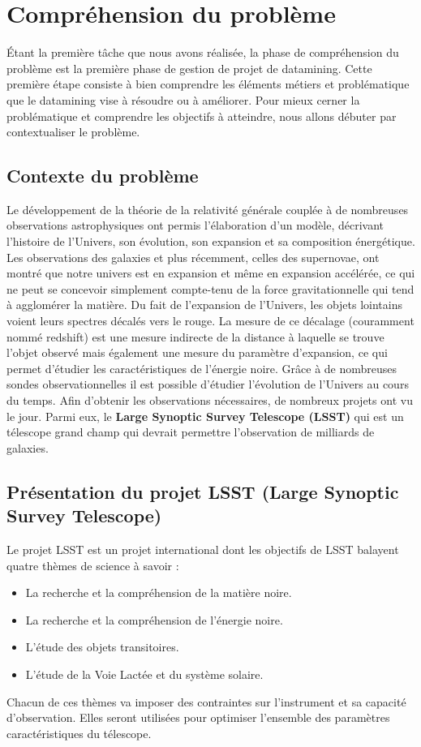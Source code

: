 \chapter{Compréhension du problème}
Étant la première tâche que nous avons réalisée, la phase de compréhension du problème est la première phase de gestion de projet de datamining. Cette première étape consiste à bien comprendre les éléments métiers et problématique que le datamining vise à résoudre ou à améliorer.
Pour mieux cerner la problématique et comprendre les objectifs à atteindre, nous allons débuter par contextualiser le problème.
\section{Contexte du problème}
Le développement de la théorie de la relativité générale couplée à de nombreuses observations astrophysiques ont permis l'élaboration d'un modèle, décrivant l'histoire de l'Univers, son évolution, son expansion et sa composition énergétique.
Les observations des galaxies et plus récemment, celles des supernovae, ont montré que notre univers est en expansion et même en expansion accélérée, ce qui ne peut se concevoir simplement compte-tenu de la force gravitationnelle qui tend à agglomérer la matière.
Du fait de l'expansion de l'Univers, les objets lointains voient leurs spectres décalés vers le rouge. La mesure de ce décalage (couramment nommé redshift) est une mesure indirecte de la distance à laquelle se trouve l'objet observé mais également une mesure du paramètre d'expansion, ce qui permet d'étudier les caractéristiques de l'énergie noire. Grâce à de nombreuses sondes observationnelles il est possible d'étudier l'évolution de l'Univers au cours du temps.
Afin d'obtenir les observations nécessaires, de nombreux projets ont vu le jour. Parmi eux, le \textbf{Large Synoptic Survey Telescope (LSST)} qui est un télescope grand champ qui devrait permettre l'observation de milliards de galaxies.
\section{Présentation du projet LSST (Large Synoptic Survey Telescope)}
Le projet LSST  est un projet international dont les objectifs de LSST balayent quatre thèmes de science à savoir :
\begin{itemize}
    \item La recherche et la compréhension de la matière noire.
    \item La recherche et la compréhension de l'énergie noire.
    \item L'étude des objets transitoires.
    \item L'étude de la Voie Lactée et du système solaire.
\end{itemize}
Chacun de ces thèmes va imposer des contraintes sur l'instrument et sa capacité d'observation.
Elles seront utilisées pour optimiser l'ensemble des paramètres caractéristiques du télescope.
